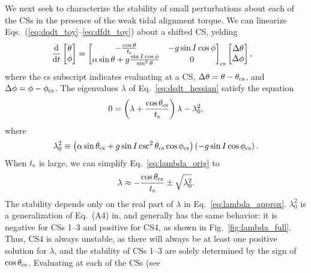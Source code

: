 \documentclass[
        fleqn,
        usenatbib,
    ]{mnras}
\newcommand*{\rd}[2]{\frac{\mathrm{d}#1}{\mathrm{d}#2}}
\newcommand*{\p}[1]{\left(#1\right)}
\begin{document}
We next seek to characterize the stability of small perturbations about each of
the CSs in the presence of the weak tidal alignment torque. We can linearize
Eqs.~(\ref{eq:dqdt_toy}--\ref{eq:dfdt_toy}) about a shifted CS, yelding
\begin{align}
    \rd{}{t}\begin{bmatrix}
        \theta\\ \phi
    \end{bmatrix} &= \begin{bmatrix}
        -\frac{\cos \theta}{t_{\rm s}} &
        -g\sin I \cos \phi \\
        \alpha \sin \theta + g\frac{\sin I \cos \phi}{\sin^2\theta} &
        0
    \end{bmatrix}_{\rm cs}\begin{bmatrix}
        \Delta \theta \\ \Delta \phi
    \end{bmatrix},\label{eq:dsdt_hessian}
\end{align}
where the cs subscript indicates evaluating at a CS, $\Delta \theta = \theta -
\theta_{\rm cs}$, and $\Delta \phi = \phi - \phi_{\rm cs}$. The eigenvalues
$\lambda$ of Eq.~\eqref{eq:dsdt_hessian} satisfy the equation
\begin{equation}
    0 = \p{\lambda + \frac{\cos \theta_{\rm cs}}{t_{\rm s}}}\lambda
        - \lambda_0^2,\label{eq:lambda_orig}
\end{equation}
where
\begin{equation}
    \lambda_0^2 \equiv \p{\alpha
        \sin \theta_{\rm cs} + g\sin I \csc^2\theta_{\rm cs}\cos \phi_{\rm cs}}
            \p{- g \sin I \cos \phi_{\rm cs}}\label{eq:def_l0_sq}.
\end{equation}
When $t_{\rm s}$ is large, we can simplify Eq.~\eqref{eq:lambda_orig} to
\begin{equation}
    \lambda \approx -\frac{\cos \theta_{\rm cs}}{t_{\rm s}}
        \pm \sqrt{\lambda_0^2}. \label{eq:lambda_approx}
\end{equation}
The stability depends only on the real part of $\lambda$ in
Eq.~\eqref{eq:lambda_approx}. $\lambda_0^2$ is a generalization of Eq.~(A4)
in, \citet{su2020} and generally has the same behavior: it is negative for CSs
1--3 and positive for CS4, as shown in Fig.~\ref{fig:lambda_full}. Thus, CS4 is
always unstable, as there will always be at least one positive solution for
$\lambda$, and the stability of CSs 1--3 are solely determined by the sign of
$\cos \theta_{\rm cs}$. Evaluating at each of the CSs (see
\end{document}
